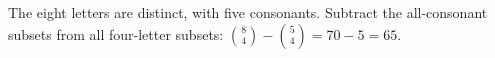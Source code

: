 The eight letters are distinct, with five consonants. Subtract the all-consonant subsets from all four-letter subsets: $\binom84-\binom54=70-5=\boxed{65}$.
